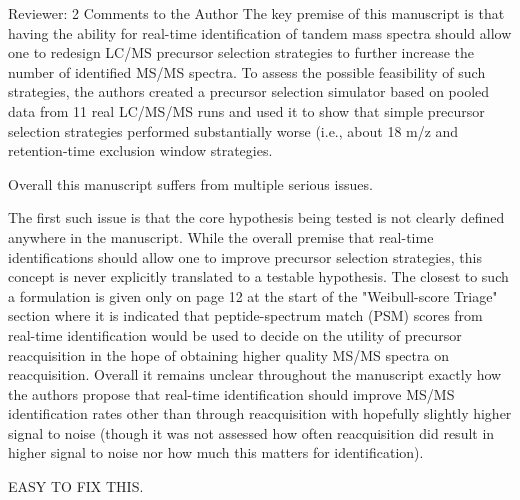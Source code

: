 Reviewer: 2
Comments to the Author
The key premise of this manuscript is that having the ability for
real-time identification of tandem mass spectra should allow one to
redesign LC/MS precursor selection strategies to further increase
the number of identified MS/MS spectra. To assess the possible
feasibility of such strategies, the authors created a precursor
selection simulator based on pooled data from 11 real LC/MS/MS runs
and used it to show that simple precursor selection strategies
performed substantially worse (i.e., about 18%
m/z and retention-time exclusion window strategies.

Overall this manuscript suffers from multiple serious issues.

The first such issue is that the core hypothesis being tested is
not clearly defined anywhere in the manuscript. While the overall
premise that real-time identifications should allow one to improve
precursor selection strategies, this concept is never explicitly
translated to a testable hypothesis. The closest to such a
formulation is given only on page 12 at the start of the
"Weibull-score Triage" section where it is indicated that
peptide-spectrum match (PSM) scores from real-time identification
would be used to decide on the utility of precursor reacquisition
in the hope of obtaining higher quality MS/MS spectra on
reacquisition. Overall it remains unclear throughout the manuscript
exactly how the authors propose that real-time identification
should improve MS/MS identification rates other than through
reacquisition with hopefully slightly higher signal to noise
(though it was not assessed how often reacquisition did result in
higher signal to noise nor how much this matters for
identification).

EASY TO FIX THIS.

